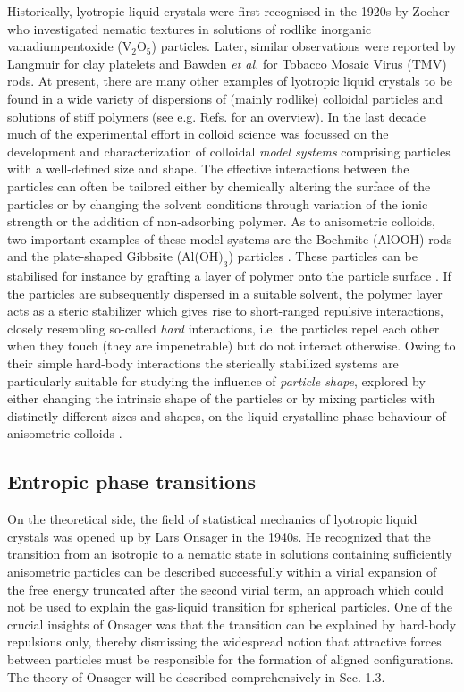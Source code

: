 {Historically, lyotropic liquid crystals were first recognised in the 1920s by Zocher \cite{Zocher}
who investigated nematic textures in solutions of rodlike inorganic vanadiumpentoxide (V$_{2}$O$_{5}$) particles.
Later, similar observations were reported by Langmuir \cite{Langmuir} for clay platelets
and Bawden {\em et al.} \cite{Bawden,Bernal} for Tobacco Mosaic Virus (TMV) rods.
At present, there are many other examples of lyotropic liquid crystals to be found in a wide
variety of dispersions of (mainly rodlike) colloidal particles and solutions of stiff polymers
(see e.g. Refs. \cite{Vroege92,Gabrieloverzicht} for an overview).
In the last decade much of the experimental effort in colloid science
was focussed on the development and characterization of colloidal {\em model systems} comprising particles
with a well-defined size and shape. The effective interactions between the particles can often be tailored
either by chemically altering the surface of the particles or by changing the solvent
conditions through variation of the ionic strength or the addition of non-adsorbing polymer.
As to anisometric colloids, two  important examples of these model systems are the  Boehmite  (AlOOH)  rods
\cite{Buiningwater,vanBruggen}
and the plate-shaped  Gibbsite (Al(OH$)_{3}$) particles \cite{Wierenga}.
These particles can be stabilised for instance by grafting a layer of polymer onto the particle surface
 \cite{vanBruggenPIB,vanderKooij}. If the particles are subsequently dispersed in a suitable solvent,
the polymer layer acts as a steric stabilizer which gives rise to short-ranged repulsive interactions,
closely resembling so-called {\em hard} interactions, i.e. the particles repel each other when they touch (they are
impenetrable) but do not interact otherwise.
Owing to their simple hard-body interactions the sterically stabilized systems
are particularly suitable for studying the influence of {\em particle shape}, explored by either
changing the intrinsic shape of the particles or by mixing particles with distinctly different sizes and shapes,
on the liquid crystalline phase behaviour of anisometric colloids \cite{felixthesis}.

\subsection{Entropic phase transitions}

On the theoretical side, the field of statistical mechanics of lyotropic
liquid crystals  was opened up by Lars Onsager in the 1940s. He recognized that the transition
from an isotropic to a nematic state in solutions containing sufficiently anisometric particles
can be described successfully  within a virial expansion of the free energy truncated after
the second virial term, an approach which could not be used to explain the gas-liquid transition for spherical particles.
 One of the crucial insights of Onsager was that the transition
can be explained by hard-body repulsions only, thereby dismissing the widespread notion
that attractive forces between particles  must be responsible for the formation of
 aligned configurations. The theory of Onsager will be described comprehensively in  Sec. 1.3.


}
